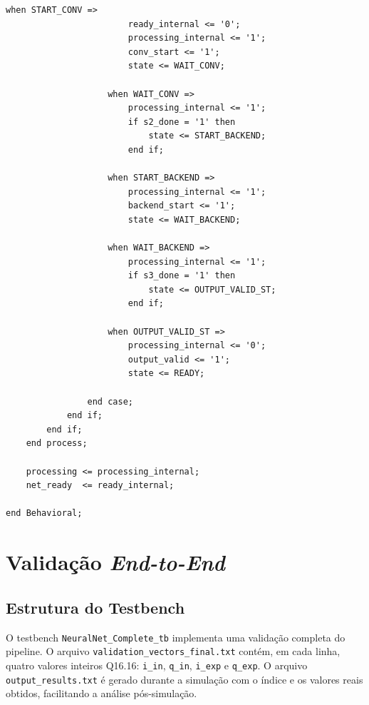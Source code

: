 \documentclass[a4paper,12pt]{article}
\begin{document}
\begin{lstlisting}[style=vhdlstyle,
    caption={C\'odigo VHDL completo do \texttt{NeuralNet\_Complete}.},
    label={lst:top}]
                    when START_CONV =>
                        ready_internal <= '0';
                        processing_internal <= '1';
                        conv_start <= '1';
                        state <= WAIT_CONV;

                    when WAIT_CONV =>
                        processing_internal <= '1';
                        if s2_done = '1' then
                            state <= START_BACKEND;
                        end if;

                    when START_BACKEND =>
                        processing_internal <= '1';
                        backend_start <= '1';
                        state <= WAIT_BACKEND;

                    when WAIT_BACKEND =>
                        processing_internal <= '1';
                        if s3_done = '1' then
                            state <= OUTPUT_VALID_ST;
                        end if;

                    when OUTPUT_VALID_ST =>
                        processing_internal <= '0';
                        output_valid <= '1';
                        state <= READY;

                end case;
            end if;
        end if;
    end process;

    processing <= processing_internal;
    net_ready  <= ready_internal;

end Behavioral;
\end{lstlisting}


\section{Valida\c{c}\~ao \textit{End-to-End}}

\subsection{Estrutura do Testbench}

O testbench \texttt{NeuralNet\_Complete\_tb} implementa uma valida\c{c}\~ao completa do pipeline. O arquivo \texttt{validation\_vectors\_final.txt} cont\'em, em cada linha, quatro valores inteiros Q16.16: \texttt{i\_in}, \texttt{q\_in}, \texttt{i\_exp} e \texttt{q\_exp}. O arquivo \texttt{output\_results.txt} \'e gerado durante a simula\c{c}\~ao com o \'indice e os valores reais obtidos, facilitando a an\'alise p\'os-simula\c{c}\~ao.
\end{document}
